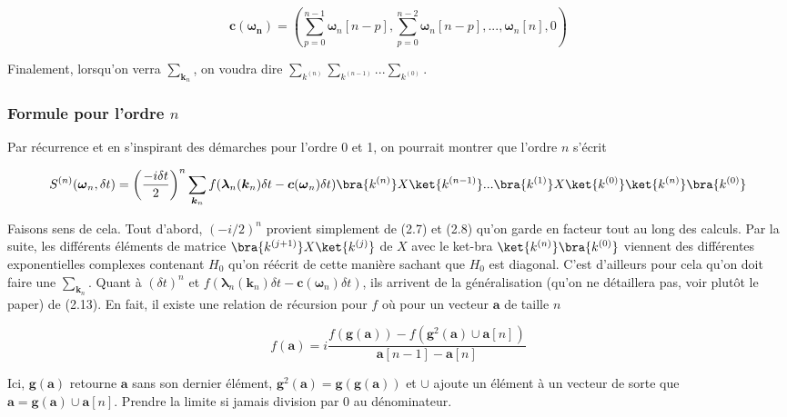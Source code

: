 \begin{equation*}
    \boldsymbol{c}(\boldsymbol{\omega_n}) = \left(\sum_{p=0}^{n-1}\boldsymbol{\omega}_n[n-p], \sum_{p=0}^{n-2}\boldsymbol{\omega}_n[n-p], ..., \boldsymbol{\omega}_n[n], 0 \right)
\end{equation*}

Finalement, lorsqu'on verra $\sum_{\boldsymbol{k}_n}$, on voudra dire $\sum_{k^{(n)}}\sum_{k^{(n-1)}}...\sum_{k^{(0)}}$.

\subsubsection{Formule pour l'ordre $n$}
Par récurrence et en s'inspirant des démarches pour l'ordre 0 et 1, on pourrait montrer que l'ordre $n$ s'écrit

\begin{equation*}
    S^{(n)}(\boldsymbol{\omega}_n, \delta t) = \left(\frac{-i \delta t}{2}\right)^n \sum_{\boldsymbol{k}_n} f(\boldsymbol{\lambda}_n(\boldsymbol{k}_n)\delta t - \boldsymbol{c}(\boldsymbol{\omega}_n)\delta t) \bra{k^{(n)}}X\ket{k^{(n-1)}}... \bra{k^{(1)}}X\ket{k^{(0)}} \ket{k^{(n)}}\bra{k^{(0)}}
\end{equation*}

Faisons sens de cela. Tout d'abord, $(-i/2)^n$ provient simplement de (2.7) et (2.8) qu'on garde en facteur tout au long des calculs. Par la suite, les différents éléments de matrice $\bra{k^{(j+1)}}X\ket{k^{(j)}}$ de $X$ avec le ket-bra $\ket{k^{(n)}}\bra{k^{(0)}}$ viennent des différentes exponentielles complexes contenant $H_0$ qu'on réécrit de cette manière sachant que $H_0$ est diagonal. C'est d'ailleurs pour cela qu'on doit faire une $\sum_{\boldsymbol{k}_n}$. Quant à $(\delta t)^n$ et $f(\boldsymbol{\lambda}_n(\boldsymbol{k}_n)\delta t - \boldsymbol{c}(\boldsymbol{\omega}_n)\delta t)$, ils arrivent de la généralisation (qu'on ne détaillera pas, voir plutôt le paper) de (2.13). En fait, il existe une relation de récursion pour $f$ où pour un vecteur $\boldsymbol{a}$ de taille $n$

\begin{equation*}
    f(\boldsymbol{a}) = i\frac{f(\boldsymbol{g}(\boldsymbol{a})) - f(\boldsymbol{g}^2(\boldsymbol{a}) \cup \boldsymbol{a}[n])}{\boldsymbol{a}[n-1] - \boldsymbol{a}[n]}
\end{equation*}

Ici, $\boldsymbol{g}(\boldsymbol{a})$ retourne $\boldsymbol{a}$ sans son dernier élément, $\boldsymbol{g}^2(\boldsymbol{a}) = \boldsymbol{g}(\boldsymbol{g}(\boldsymbol{a}))$ et $\cup$ ajoute un élément à un vecteur de sorte que $\boldsymbol{a} = \boldsymbol{g}(\boldsymbol{a}) \cup \boldsymbol{a}[n]$. Prendre la limite si jamais division par 0 au dénominateur.

